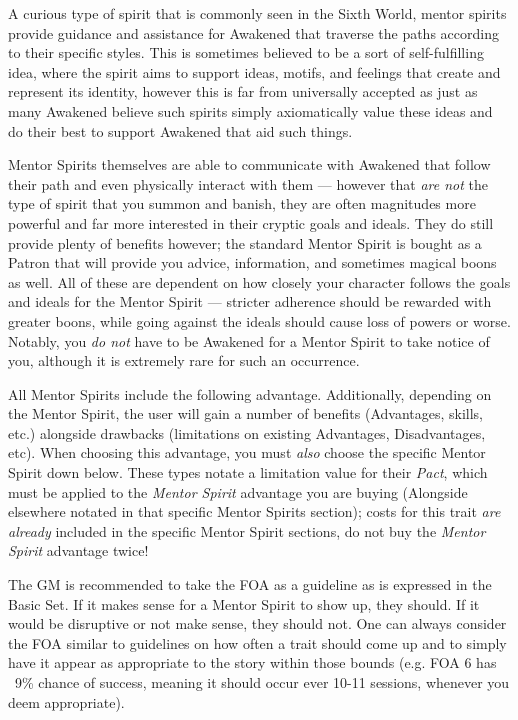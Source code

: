 \begin{multicols}{3}
	A curious type of spirit that is commonly seen in the Sixth World, mentor spirits provide guidance and assistance for Awakened that traverse the paths according to their specific styles. This is sometimes believed to be a sort of self-fulfilling idea, where the spirit aims to support ideas, motifs, and feelings that create and represent its identity, however this is far from universally accepted as just as many Awakened believe such spirits simply axiomatically value these ideas and do their best to support Awakened that aid such things.
	
	Mentor Spirits themselves are able to communicate with Awakened that follow their path and even physically interact with them — however that \textit{are not} the type of spirit that you summon and banish, they are often magnitudes more powerful and far more interested in their cryptic goals and ideals. They do still provide plenty of benefits however; the standard Mentor Spirit is bought as a Patron that will provide you advice, information, and sometimes magical boons as well. All of these are dependent on how closely your character follows the goals and ideals for the Mentor Spirit — stricter adherence should be rewarded with greater boons, while going against the ideals should cause loss of powers or worse. Notably, you \textit{do not} have to be Awakened for a Mentor Spirit to take notice of you, although it is extremely rare for such an occurrence.
	
	All Mentor Spirits include the following advantage. Additionally, depending on the Mentor Spirit, the user will gain a number of benefits (Advantages, skills, etc.) alongside drawbacks (limitations on existing Advantages, Disadvantages, etc). When choosing this advantage, you must \textit{also} choose the specific Mentor Spirit down below. These types notate a limitation value for their \textit{Pact}, which must be applied to the \textit{Mentor Spirit} advantage you are buying (Alongside elsewhere notated in that specific Mentor Spirits section); costs for this trait \textit{are already} included in the specific Mentor Spirit sections, do not buy the \textit{Mentor Spirit} advantage twice!
	
	The GM is recommended to take the FOA as a guideline as is expressed in the Basic Set. If it makes sense for a Mentor Spirit to show up, they should. If it would be disruptive or not make sense, they should not. One can always consider the FOA similar to guidelines on how often a trait should come up and to simply have it appear as appropriate to the story within those bounds (e.g. FOA 6 has ~9\% chance of success, meaning it should occur ever 10-11 sessions, whenever you deem appropriate).
	

\end{multicols}
